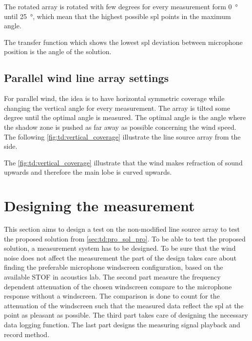 
The rotated array is rotated with few degrees for every measurement form \SI{0}{\degree} until \SI{25}{\degree}, which mean that the highest possible \gls{spl} points in the maximum angle. 

The transfer function which shows the lowest \gls{spl} deviation between microphone position is the angle of the solution. 

\subsection{Parallel wind line array settings}\label{sub:des:par_set}

For parallel wind, the idea is to have horizontal symmetric coverage while changing the vertical angle for every measurement. The array is tilted some degree until the optimal angle is measured. The optimal angle is the angle where the shadow zone is pushed as far away as possible concerning the wind speed. The following \autoref{fig:td:vertical_coverage} illustrate the line source array from the side.

   

The \autoref{fig:td:vertical_coverage} illustrate that the wind makes refraction of sound upwards and therefore the main lobe is curved upwards.


\section{Designing the measurement}\label{sec:des:des_mes}
This section aims to design a test on the non-modified line source array to test the proposed solution from \autoref{sec:td:pro_sol_pro}. To be able to test the proposed solution, a measurement system has to be designed. To be sure that the wind noise does not affect the measurement the part of the design takes care about finding the preferable microphone windscreen configuration, based on the available STOF in acoustics lab. The second part measure the frequency dependent attenuation of the chosen windscreen compare to the microphone response without a windscreen. The comparison is done to count for the attenuation of the windscreen such that the measured data reflect the \gls{spl} at the point as pleasant as possible. The third part takes care of designing the necessary data logging function. The last part designs the measuring signal playback and record method.

